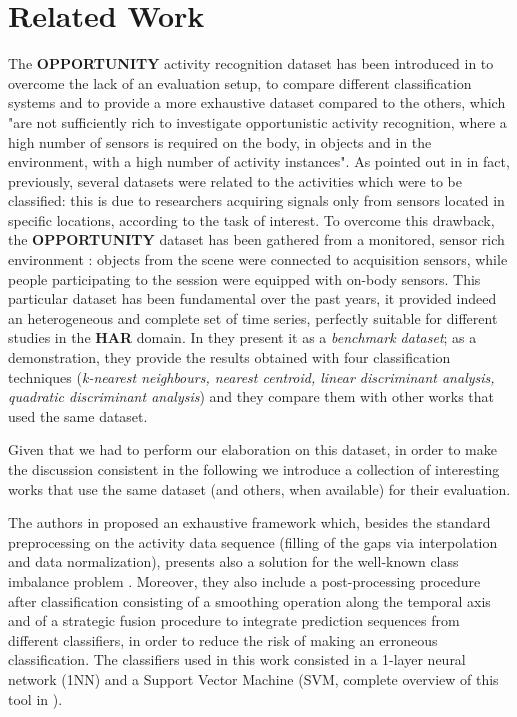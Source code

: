 
\section{Related Work}
\label{sec:related_work}
The \textbf{OPPORTUNITY} activity recognition dataset has been introduced in \cite{ComplexAct-2010} to overcome the lack of an evaluation setup, to compare different classification systems and to provide a more exhaustive dataset compared to the others, which "are not sufficiently rich to investigate opportunistic activity recognition, where a high number of sensors is required on the body, in objects and in the environment, with a high number of activity instances". As pointed out in \cite{Chavarriaga2013} in fact, previously, several datasets were related to the activities which were to be classified: this is due to researchers acquiring signals only from sensors located in specific locations, according to the task of interest.
To overcome this drawback, the \textbf{OPPORTUNITY} dataset has been gathered from a monitored, sensor rich environment  : objects from the scene were connected to acquisition sensors, while people participating to the session were equipped with on-body sensors. This particular dataset has been fundamental over the past years, it provided indeed an heterogeneous and complete set of time series, perfectly suitable for different studies in the \textbf{HAR} domain. In \cite{Chavarriaga2013} they present it as a \textit{benchmark dataset}; as a demonstration, they provide the results obtained with four classification techniques (\textit{k-nearest neighbours, nearest centroid, linear discriminant analysis, quadratic discriminant analysis}) and they compare them with other works that used the same dataset. 

Given that we had to perform our elaboration on this dataset, in order to make the discussion consistent in the following we introduce a collection of interesting works that use the same dataset (and others, when available) for their evaluation.

The authors in \cite{cao2012integrated} proposed an exhaustive framework which, besides the standard preprocessing on the activity data sequence (filling of the gaps via interpolation and data normalization), presents also a solution for the well-known class imbalance problem \cite{japkowicz2002class}. Moreover, they also include a post-processing procedure after classification consisting of a smoothing operation along the temporal axis  and of a strategic fusion procedure to integrate prediction sequences from different classifiers, in order to reduce the risk of making an erroneous classification. The classifiers used in this work consisted in a 1-layer neural network (1NN) and a Support Vector Machine (SVM, complete overview of this tool in \cite{hearst1998support}). 

